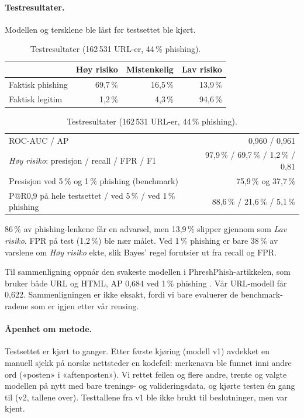 \documentclass[11pt,a4paper]{article}
\begin{document}
\paragraph{Testresultater.} Modellen og tersklene ble låst før testsettet ble kjørt.

\begin{table}[H]
\centering
\small
\caption{Testresultater (162\,531 URL-er, 44\,\% phishing).}\label{tab:test}
\begin{tabular}{lrrr}
\toprule
 & Høy risiko & Mistenkelig & Lav risiko \\
\midrule
Faktisk phishing & 69,7\,\% & 16,5\,\% & 13,9\,\% \\
Faktisk legitim & 1,2\,\% & 4,3\,\% & 94,6\,\% \\
\bottomrule
\end{tabular}

\vspace{6pt}
\begin{tabular}{lr}
\toprule
ROC-AUC / AP & 0,960 / 0,961 \\
\emph{Høy risiko}: presisjon / recall / FPR / F1 & 97,9\,\% / 69,7\,\% / 1,2\,\% / 0,81 \\
Presisjon ved 5\,\% og 1\,\% phishing (benchmark) & 75,9\,\% og 37,7\,\% \\
P@R0,9 på hele testsettet / ved 5\,\% / ved 1\,\% phishing & 88,6\,\% / 21,6\,\% / 5,1\,\% \\
\bottomrule
\end{tabular}
\end{table}

86\,\% av phishing-lenkene får en advarsel, men 13,9\,\% slipper gjennom som \emph{Lav risiko}. FPR på test (1,2\,\%) ble nær målet. Ved 1\,\% phishing er bare 38\,\% av varslene om \emph{Høy risiko} ekte, slik Bayes' regel forutsier ut fra recall og FPR.

Til sammenligning oppnår den svakeste modellen i PhreshPhish-artikkelen, som bruker både URL og HTML, AP 0,684 ved 1\,\% phishing \cite{phreshphish}. Vår URL-modell får 0,622. Sammenligningen er ikke eksakt, fordi vi bare evaluerer de benchmark-radene som er igjen etter vår rensing.

\paragraph{Åpenhet om metode.} Testsettet er kjørt to ganger. Etter første kjøring (modell v1) avdekket en manuell sjekk på norske nettsteder en kodefeil: merkenavn ble funnet inni andre ord («posten» i «aftenposten»). Vi rettet feilen og flere andre, trente og valgte modellen på nytt med bare trenings- og valideringsdata, og kjørte testen én gang til (v2, tallene over). Testtallene fra v1 ble ikke brukt til beslutninger, men var kjent.
\end{document}
